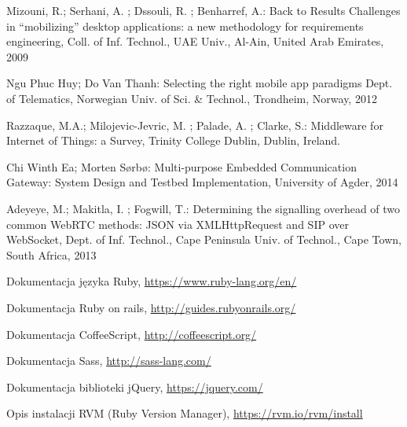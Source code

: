  Mizouni, R.; Serhani, A. ; Dssouli, R. ; Benharref, A.: Back to Results Challenges in “mobilizing” desktop applications: a new methodology for requirements engineering,  Coll. of Inf. Technol., UAE Univ., Al-Ain, United Arab Emirates, 2009

 Ngu Phuc Huy; Do Van Thanh: Selecting the right mobile app paradigms Dept. of Telematics, Norwegian Univ. of Sci. \& Technol., Trondheim, Norway, 2012

Razzaque, M.A.; Milojevic-Jevric, M. ; Palade, A. ; Clarke, S.: Middleware for Internet of Things: a Survey,  Trinity College Dublin, Dublin, Ireland.

 Chi Winth Ea; Morten Sørbø: Multi-purpose Embedded Communication Gateway: System Design and Testbed Implementation, University of Agder, 2014

 Adeyeye, M.; Makitla, I. ; Fogwill, T.: Determining the signalling overhead of two common WebRTC methods: JSON via XMLHttpRequest and SIP over WebSocket, Dept. of Inf. Technol., Cape Peninsula Univ. of Technol., Cape Town, South Africa, 2013

 Dokumentacja języka Ruby, \url{https://www.ruby-lang.org/en/}

 Dokumentacja Ruby on rails, \url{http://guides.rubyonrails.org/}

 Dokumentacja CoffeeScript, \url{http://coffeescript.org/}

 Dokumentacja Sass, \url{http://sass-lang.com/}

 Dokumentacja biblioteki jQuery, \url{https://jquery.com/}

 Opis instalacji RVM (Ruby Version Manager), \url{https://rvm.io/rvm/install }
